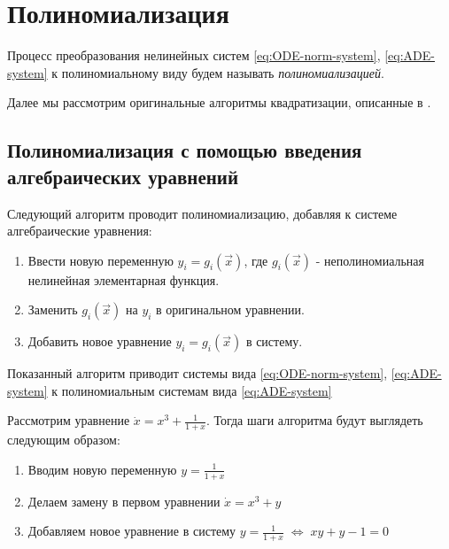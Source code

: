 
\section{Полиномиализация} \label{sec:polynomialization}

\begin{definition}
    Процесс преобразования нелинейных систем \eqref{eq:ODE-norm-system}, \eqref{eq:ADE-system} к полиномиальному виду будем называть \textit{полиномиализацией}.
\end{definition}

Далее мы рассмотрим оригинальные алгоритмы квадратизации, описанные в \cite{Gu-PhD}.

\subsection{Полиномиализация с помощью введения алгебраических уравнений} \label{sec:poly-algebraic}

Следующий алгоритм проводит полиномиализацию, добавляя к системе алгебраические уравнения:
\begin{enumerate}
    \item Ввести новую переменную $y_i = g_i(\vec x)$, где $g_i(\vec x)$ - неполиномиальная нелинейная элементарная функция.
    \item Заменить $g_i(\vec x)$ на $y_i$ в оригинальном уравнении.
    \item  Добавить новое уравнение $y_i = g_i(\vec x)$ в систему.
\end{enumerate}

Показанный алгоритм приводит системы вида \eqref{eq:ODE-norm-system}, \eqref{eq:ADE-system} к полиномиальным системам вида \eqref{eq:ADE-system}

\begin{example}
    Рассмотрим уравнение $\dot x = x^3 + \frac{1}{1 + x}$. Тогда шаги алгоритма будут выглядеть следующим образом:
    \begin{enumerate}
        \item Вводим новую переменную $y = \frac{1}{1 + x}$
        \item Делаем замену в первом уравнении $\dot x = x^3 + y$
        \item  Добавляем новое уравнение в систему $y = \frac{1}{1 + x}\; \Leftrightarrow \; xy + y - 1 = 0$
    \end{enumerate}
\end{example}


